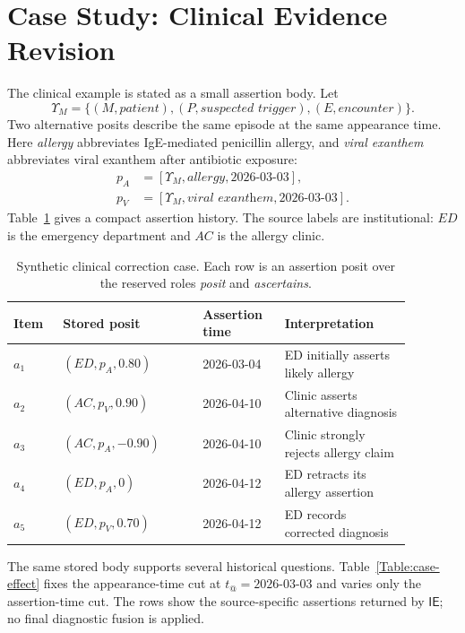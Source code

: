 \documentclass[a4paper,fleqn]{cas-sc}
\newcommand{\ie}{\mathsf{IE}}
\theoremstyle{plain}
\theoremstyle{remark}
\begin{document}
\section{Case Study: Clinical Evidence Revision}
\label{Sec:case}
The clinical example is stated as a small assertion body. Let
\[
\Upsilon_M=\{(M,\textit{patient}),(P,\textit{suspected trigger}),(E,\textit{encounter})\}.
\]
Two alternative posits describe the same episode at the same appearance time. Here \textit{allergy} abbreviates IgE-mediated penicillin allergy, and \textit{viral exanthem} abbreviates viral exanthem after antibiotic exposure:
\[
\begin{aligned}
p_A&=[\Upsilon_M,\textit{allergy},2026\text{-}03\text{-}03],\\
p_V&=[\Upsilon_M,\textit{viral exanthem},2026\text{-}03\text{-}03].
\end{aligned}
\]
Table~\ref{Table:case} gives a compact assertion history. The source labels are institutional: \(ED\) is the emergency department and \(AC\) is the allergy clinic.

\begin{table}[t]
\centering
\small
\begin{tabular}{p{0.11\linewidth} p{0.31\linewidth} p{0.18\linewidth} p{0.28\linewidth}}
\toprule
Item & Stored posit & Assertion time & Interpretation \\
\midrule
\(a_1\) & \((ED,p_A,0.80)\) & 2026-03-04 & ED initially asserts likely allergy \\
\(a_2\) & \((AC,p_V,0.90)\) & 2026-04-10 & Clinic asserts alternative diagnosis \\
\(a_3\) & \((AC,p_A,-0.90)\) & 2026-04-10 & Clinic strongly rejects allergy claim \\
\(a_4\) & \((ED,p_A,0)\) & 2026-04-12 & ED retracts its allergy assertion \\
\(a_5\) & \((ED,p_V,0.70)\) & 2026-04-12 & ED records corrected diagnosis \\
\bottomrule
\end{tabular}
\caption{Synthetic clinical correction case. Each row is an assertion posit over the reserved roles \textit{posit} and \textit{ascertains}.}
\label{Table:case}
\end{table}

The same stored body supports several historical questions. Table~\ref{Table:case-effect} fixes the appearance-time cut at \(t_@=2026\text{-}03\text{-}03\) and varies only the assertion-time cut. The rows show the source-specific assertions returned by \(\ie\); no final diagnostic fusion is applied.
\end{document}
